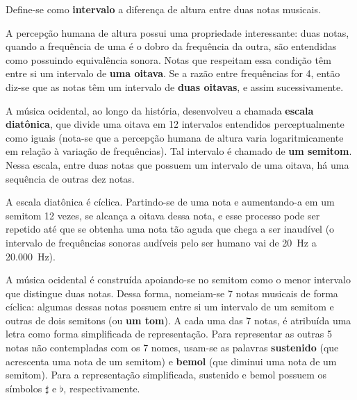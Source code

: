     Define-se como \textbf{intervalo} a diferença de altura entre duas notas musicais.
    
    A percepção humana de altura possui uma propriedade interessante: duas notas, quando a frequência de uma é o dobro da frequência da outra, são entendidas como possuindo equivalência sonora. Notas que respeitam essa condição têm entre si um intervalo de \textbf{uma oitava}. Se a razão entre frequências for 4, então diz-se que as notas têm um intervalo de \textbf{duas oitavas}, e assim sucessivamente.
    
    A música ocidental, ao longo da história, desenvolveu a chamada \textbf{escala diatônica}, que divide uma oitava em 12 intervalos entendidos perceptualmente como iguais (nota-se que a percepção humana de altura varia logaritmicamente em relação à variação de frequências). Tal intervalo é chamado de \textbf{um semitom}. Nessa escala, entre duas notas que possuem um intervalo de uma oitava, há uma sequência de outras dez notas. 

    A escala diatônica é cíclica. Partindo-se de uma nota e aumentando-a em um semitom 12 vezes, se alcança a oitava dessa nota, e esse processo pode ser repetido até que se obtenha uma nota tão aguda que chega a ser inaudível (o intervalo de frequências sonoras audíveis pelo ser humano vai de 20~Hz a 20.000~Hz).

    A música ocidental é construída apoiando-se no semitom como o menor intervalo que distingue duas notas. Dessa forma, nomeiam-se 7 notas musicais de forma cíclica: algumas dessas notas possuem entre si um intervalo de um semitom e outras de dois semitons (ou \textbf{um tom}). 
    A cada uma das 7 notas, é atribuída uma letra como forma simplificada de representação. Para representar as outras 5 notas não contempladas com os 7 nomes, usam-se as palavras \textbf{sustenido} (que acrescenta uma nota de um semitom) e \textbf{bemol} (que diminui uma nota de um semitom). Para a representação simplificada, sustenido e bemol possuem os símbolos $\sharp$ e $\flat$, respectivamente.
    
